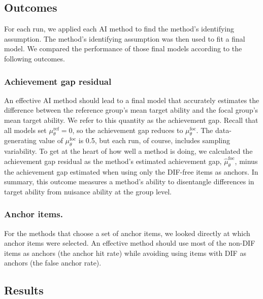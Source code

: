 \documentclass[
  11pt,
]{article}
\begin{document}
\hypertarget{outcomes}{%
\subsection{Outcomes}\label{outcomes}}

For each run, we applied each AI method to find the method's identifying assumption. The method's identifying assumption was then used to fit a final model. We compared the performance of those final models according to the following outcomes.

\hypertarget{achievement-gap-residual}{%
\subsubsection{Achievement gap residual}\label{achievement-gap-residual}}

An effective AI method should lead to a final model that accurately estimates the difference between the reference group's mean target ability and the focal group's mean target ability. We refer to this quantity as the achievement gap. Recall that all models set \(\mu_\theta^\text{ref} = 0\), so the achievement gap reduces to \(\mu_\theta^\text{foc}\). The data-generating value of \(\mu_\theta^\text{foc}\) is 0.5, but each run, of course, includes sampling variability. To get at the heart of how well a method is doing, we calculated the achievement gap residual as the method's estimated achievement gap, \(\hat\mu_\theta^\text{foc}\), minus the achievement gap estimated when using only the DIF-free items as anchors. In summary, this outcome measures a method's ability to disentangle differences in target ability from nuisance ability at the group level.

\hypertarget{anchor-items.}{%
\subsubsection{Anchor items.}\label{anchor-items.}}

For the methods that choose a set of anchor items, we looked directly at which anchor items were selected. An effective method should use most of the non-DIF items as anchors (the anchor hit rate) while avoiding using items with DIF as anchors (the false anchor rate).

\hypertarget{results}{%
\subsection{Results}\label{results}}
\end{document}
